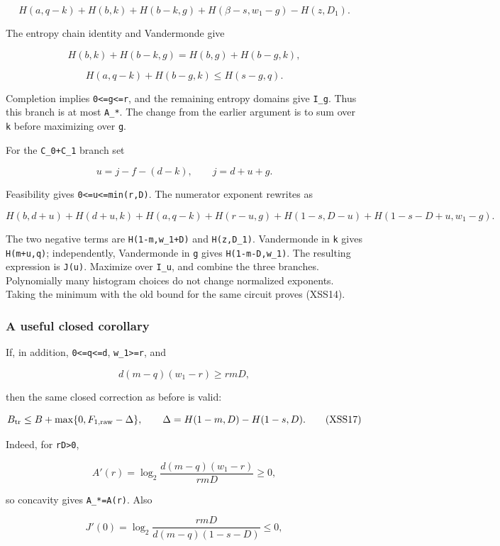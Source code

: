 \[
H(a,q-k)+H(b,k)+H(b-k,g)+H(\beta-s,w_1-g)-H(z,D_1).
\]

The entropy chain identity and Vandermonde give

\[
H(b,k)+H(b-k,g)=H(b,g)+H(b-g,k),
\]

\[
H(a,q-k)+H(b-g,k)\le H(s-g,q).
\]

Completion implies \texttt{0\textless{}=g\textless{}=r}, and the remaining entropy domains give \texttt{I\_g}. Thus this branch is at most \texttt{A\_*}. The change from the earlier argument is to sum over \texttt{k} before maximizing over \texttt{g}.

For the \texttt{C\_0+C\_1} branch set

\[
u=j-f-(d-k),\qquad j=d+u+g.
\]

Feasibility gives \texttt{0\textless{}=u\textless{}=min(r,D)}. The numerator exponent rewrites as

\[
H(b,d+u)+H(d+u,k)+H(a,q-k)
 +H(r-u,g)+H(1-s,D-u)+H(1-s-D+u,w_1-g).
\]

The two negative terms are \texttt{H(1-m,w\_1+D)} and \texttt{H(z,D\_1)}. Vandermonde in \texttt{k} gives \texttt{H(m+u,q)}; independently, Vandermonde in \texttt{g} gives \texttt{H(1-m-D,w\_1)}. The resulting expression is \texttt{J(u)}. Maximize over \texttt{I\_u}, and combine the three branches. Polynomially many histogram choices do not change normalized exponents. Taking the minimum with the old bound for the same circuit proves (XSS14).

\hypertarget{af-a9ec399514-a-useful-closed-corollary}{%
\subsubsection{A useful closed corollary}\label{af-a9ec399514-a-useful-closed-corollary}}

If, in addition, \texttt{0\textless{}=q\textless{}=d}, \texttt{w\_1\textgreater{}=r}, and

\[
d(m-q)(w_1-r)\ge rmD,
 \tag{XSS16}
\]

then the same closed correction as before is valid:

\[
B_{\rm tr}\le B+\max\{0,F_{1,\rm raw}-\Delta\},\qquad
 \Delta=H(1-m,D)-H(1-s,D).
 \tag{XSS17}
\]

Indeed, for \texttt{rD\textgreater{}0},

\[
A'(r)=\log_2\frac{d(m-q)(w_1-r)}{rmD}\ge0,
\]

so concavity gives \texttt{A\_*=A(r)}. Also

\[
J'(0)=\log_2\frac{rmD}{d(m-q)(1-s-D)}\le0,
\]

